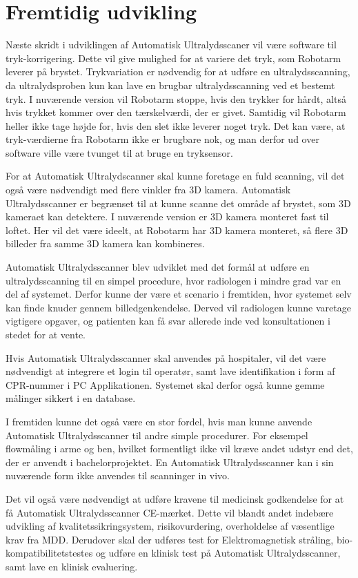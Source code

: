 \chapter{Fremtidig udvikling}\label{kapitel_Fremtidig udvikling}

Næste skridt i udviklingen af Automatisk Ultralydsscaner vil være software til tryk-korrigering.
Dette vil give mulighed for at variere det tryk, som Robotarm leverer på brystet. Trykvariation er nødvendig for at udføre en ultralydsscanning, da ultralydsproben kun kan lave en brugbar ultralydsscanning ved et bestemt tryk. 
I nuværende version vil Robotarm stoppe, hvis den trykker for hårdt, altså hvis trykket kommer over den tærskelværdi, der er givet. Samtidig vil Robotarm heller ikke tage højde for, hvis den slet ikke leverer noget tryk.
Det kan være, at tryk-værdierne fra Robotarm ikke er brugbare nok, og man derfor ud over software ville være tvunget til at bruge en tryksensor.

For at Automatisk Ultralydscanner skal kunne foretage en fuld scanning, vil det også være nødvendigt med flere vinkler fra 3D kamera. Automatisk Ultralydsscanner er begrænset til at kunne scanne det område af brystet, som 3D kameraet kan detektere. I nuværende version er 3D kamera monteret fast til loftet. Her vil det være ideelt, at Robotarm har 3D kamera monteret, så flere 3D billeder fra samme 3D kamera kan kombineres.

Automatisk Ultralydsscanner blev udviklet med det formål at udføre en ultralydsscanning til en simpel procedure, hvor radiologen i mindre grad var en del af systemet. Derfor kunne der være et scenario i fremtiden, hvor systemet selv kan finde knuder gennem billedgenkendelse. Derved vil radiologen kunne varetage vigtigere opgaver, og patienten kan få svar allerede inde ved konsultationen i stedet for at vente.

Hvis Automatisk Ultralydsscanner skal anvendes på hospitaler, vil det være nødvendigt at integrere et login til operatør, samt lave identifikation i form af CPR-nummer i PC Applikationen. Systemet skal derfor også kunne gemme målinger sikkert i en database. 

I fremtiden kunne det også være en stor fordel, hvis man kunne anvende Automatisk Ultralydsscanner til andre simple procedurer. For eksempel flowmåling i arme og ben, hvilket formentligt ikke vil kræve andet udstyr end det, der er anvendt i bachelorprojektet. En Automatisk Ultralydsscanner kan i sin nuværende form ikke anvendes til scanninger in vivo.

Det vil også være nødvendigt at udføre kravene til medicinsk godkendelse for at få Automatisk Ultralydsscanner CE-mærket. Dette vil blandt andet indebære udvikling af kvalitetssikringsystem, risikovurdering, overholdelse af væsentlige krav fra MDD. Derudover skal der udføres test for Elektromagnetisk stråling, bio-kompatibilitetstestes og udføre en klinisk test på Automatisk Ultralydsscanner, samt lave en klinisk evaluering. 
